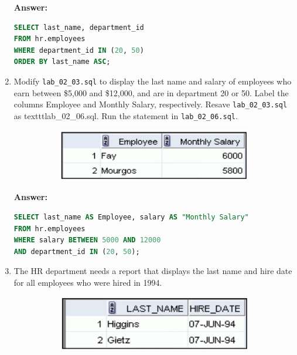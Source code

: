 \documentclass[a4paper,12pt]{article}
\begin{document}
\begin{enumerate}
    \textbf{Answer: }
    \begin{lstlisting}[language=SQL, label={lst:employees_data}]
SELECT last_name, department_id
FROM hr.employees
WHERE department_id IN (20, 50)
ORDER BY last_name ASC;
    \end{lstlisting}
    \item Modify \texttt{lab\_02\_03.sql} to display the last name and salary of employees who earn between
\$5,000 and \$12,000, and are in department 20 or 50. Label the columns Employee and
Monthly Salary, respectively. Resave \texttt{lab\_02\_03.sql} as texttt{lab\_02\_06.sql}. Run the
statement in \texttt{lab\_02\_06.sql}.
\begin{figure}[h]
        \centering
        \begin{subfigure}[b]{0.35\linewidth}
            \centering
            \includegraphics[width=\linewidth]{graphics/26.png}
        \end{subfigure}
    \end{figure}        
    \newpage
    \textbf{Answer: }
    \begin{lstlisting}[language=SQL, label={lst:employees_data}]
SELECT last_name AS Employee, salary AS "Monthly Salary"
FROM hr.employees
WHERE salary BETWEEN 5000 AND 12000
AND department_id IN (20, 50);
    \end{lstlisting}
    \item The HR department needs a report that displays the last name and hire date for all employees
who were hired in 1994.
\begin{figure}[h]
        \centering
        \begin{subfigure}[b]{0.35\linewidth}
            \centering
            \includegraphics[width=\linewidth]{graphics/27.png}
        \end{subfigure}
    \end{figure}        


\end{enumerate}
\end{document}
